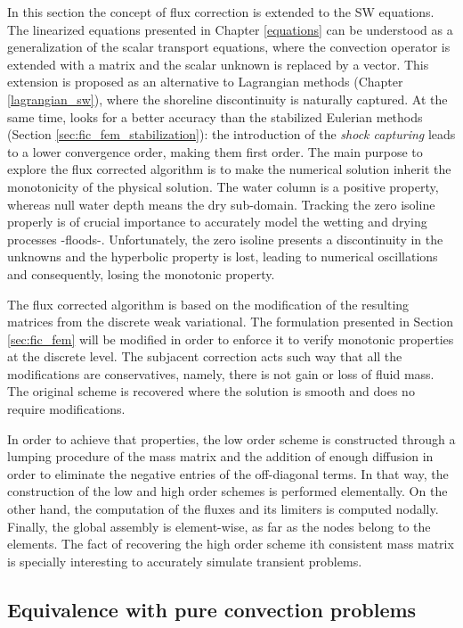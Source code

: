 In this section the concept of flux correction is extended to the SW equations. The linearized equations presented in Chapter \ref{equations} can be understood as a generalization of the scalar transport equations, where the convection operator is extended with a matrix and the scalar unknown is replaced by a vector. This extension is proposed as an alternative to Lagrangian methods (Chapter \ref{lagrangian_sw}), where the shoreline discontinuity is naturally captured. At the same time, looks for a better accuracy than the stabilized Eulerian methods (Section \ref{sec:fic_fem_stabilization}):
the introduction of the \emph{shock capturing} leads to a lower convergence order, making them first order. The main purpose to explore the flux corrected algorithm is to make the numerical solution inherit the monotonicity of the physical solution. The water column is a positive property, whereas null water depth means the dry sub-domain.
Tracking the zero isoline properly is of crucial importance to accurately model the wetting and drying processes -floods-. Unfortunately, the zero isoline presents a discontinuity in the unknowns and the hyperbolic property is lost, leading to numerical oscillations and consequently, losing the monotonic property.


The flux corrected algorithm is based on the modification of the resulting matrices from the discrete weak variational. The formulation presented in Section \ref{sec:fic_fem} will be modified in order to enforce it to verify monotonic properties at the discrete level. The subjacent correction acts such way that all the modifications are conservatives, namely, there is not gain or loss of fluid mass. The original scheme is recovered where the solution is smooth and does no require modifications.


In order to achieve that properties, the low order scheme is constructed through a lumping procedure of the mass matrix and the addition of enough diffusion in order to eliminate the negative entries of the off-diagonal terms. In that way, the construction of the low and high order schemes is performed elementally. On the other hand, the computation of the fluxes and its limiters is computed nodally. Finally, the global assembly is element-wise, as far as the nodes belong to the elements. The fact of recovering the high order scheme ith consistent mass matrix is specially interesting to accurately simulate transient problems.




\subsection{Equivalence with pure convection problems}

